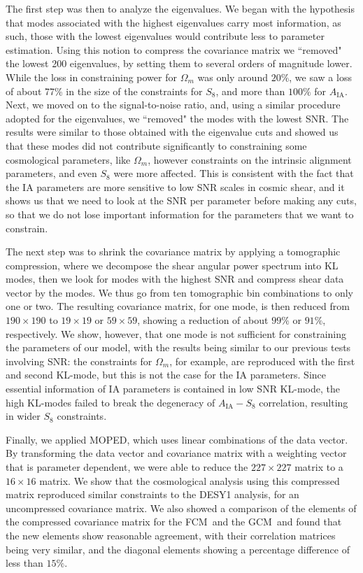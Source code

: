 \documentclass[twocolumn,nofootinbib]{\docclass}
\newcommand\full{the FCM}
\newcommand\gaussian{the GCM}
\begin{document}
The first step was then to analyze the eigenvalues. We began with the hypothesis that modes associated with the highest eigenvalues carry most information, as such, those with the lowest eigenvalues would contribute less to parameter estimation. Using this notion to compress the covariance matrix we ``removed" the lowest 200 eigenvalues, by setting them to several orders of magnitude lower. While the loss in constraining power for $\Omega_m$ was only around $20\%$, we saw a loss of about 77\% in the size of the constraints for $S_8$, and more than $100\%$ for $A_{\text{IA}}$. Next, we moved on to the signal-to-noise ratio, and, using a similar procedure adopted for the eigenvalues, we ``removed" the modes with the lowest SNR. The results were similar to those obtained with the eigenvalue cuts and showed us that these modes did not contribute significantly to constraining some cosmological parameters, like $\Omega_m$, however constraints on the intrinsic alignment parameters, and even $S_8$ were more affected. This is consistent with the fact that the IA parameters are more sensitive to low SNR scales in cosmic shear, and it shows us that we need to look at the SNR per parameter before making any cuts, so that we do not lose important information for the parameters that we want to constrain.

The next step was to shrink the covariance matrix by applying a tomographic compression, where we decompose the shear angular power spectrum into KL modes, then we look for modes with the highest SNR and compress shear data vector by the modes. We thus go from ten tomographic bin combinations to only one or two. The resulting covariance matrix, for one mode, is then reduced from $190 \times 190$ to $19 \times 19$ or $59 \times 59$, showing a reduction of about $99\%$ or $91\%$, respectively. We show, however, that one mode is not sufficient for constraining the parameters of our model, with the results being similar to our previous tests involving SNR: the constraints for $\Omega_m$, for example, are reproduced with the first and second KL-mode, but this is not the case for the IA parameters. Since essential information of IA parameters is contained in low SNR KL-mode, the high KL-modes failed to break the degeneracy of $A_{\text{IA}}-S_8$ correlation, resulting in wider $S_8$ constraints. 

Finally, we applied MOPED, which uses linear combinations of the data vector. By transforming the data vector and covariance matrix with a weighting vector that is parameter dependent, we were able to reduce the $227 \times 227$ matrix to a $16 \times 16$ matrix.
We show that the cosmological analysis using this compressed matrix reproduced similar constraints to the DESY1 analysis, for an uncompressed covariance matrix. We also showed a comparison of the elements of the compressed covariance matrix for \full\ and \gaussian\ and found that the new elements show reasonable agreement, with their correlation matrices being very similar, and the diagonal elements showing a percentage difference of less than $15\%$.
\end{document}
